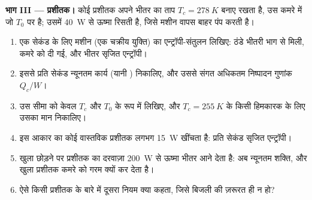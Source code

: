 \begin{problem}[{सप्ताहांत समस्या --- ठंडा होता एक प्याला, मिलाया गया एक
जल-कुंड, एक प्रशीतक और अणुओं का एक डिब्बा: चार एन्ट्रॉपी-संतुलन, और सृजित
एन्ट्रॉपी कार्य के रूप में कितनी क़ीमत की थी}]
\medskip
\noindent\textbf{भाग III --- प्रशीतक।}
कोई प्रशीतक अपने भीतर का ताप $T_c = \qty{278}{K}$ बनाए रखता है, उस कमरे
में जो $T_0$ पर है; उसमें \qty{40}{W} से ऊष्मा रिसती है, जिसे मशीन वापस बाहर पंप करती है।
\begin{enumerate}[resume]
  \item एक सेकंड के लिए मशीन (एक चक्रीय युक्ति) का एन्ट्रॉपी-संतुलन
        लिखिए: ठंडे भीतरी भाग से मिली, कमरे को दी गई, और भीतर सृजित
        एन्ट्रॉपी।
  \item इससे प्रति सेकंड न्यूनतम कार्य (यानी ) निकालिए, और
        उससे संगत अधिकतम निष्पादन गुणांक
        $Q_c/W$।
  \item उस सीमा को केवल $T_c$ और $T_0$ के रूप में लिखिए, और $T_c = \qty{255}{K}$
        के किसी हिमकारक के लिए उसका मान निकालिए।
  \item इस आकार का कोई वास्तविक प्रशीतक लगभग \qty{15}{W} खींचता है: प्रति
        सेकंड सृजित एन्ट्रॉपी।
  \item खुला छोड़ने पर प्रशीतक का दरवाज़ा \qty{200}{W} से ऊष्मा भीतर आने
        देता है: अब न्यूनतम शक्ति, और खुला प्रशीतक कमरे को गरम क्यों कर
        देता है।
  \item ऐसे किसी प्रशीतक के बारे में दूसरा नियम क्या कहता, जिसे बिजली की
        ज़रूरत ही न हो?
\end{enumerate}


\end{problem}

